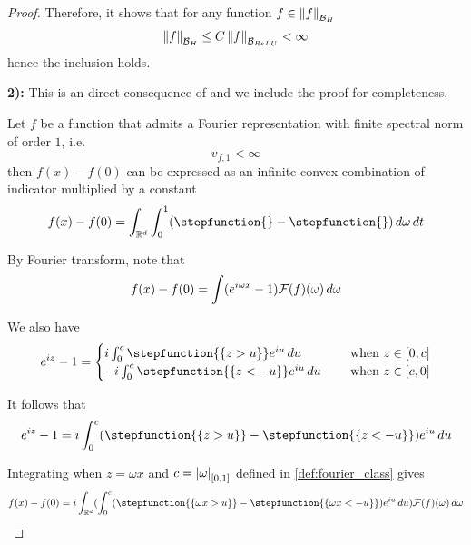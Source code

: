 \begin{proof}
Therefore, it shows that for any function $f \in \left\| f \right\|_{\mathcal{B}_H}$
\begin{equation}
    \left\| f \right\|_{\mathcal{B}_H} \leq C \left\| f \right\|_{\mathcal{B}_{ReLU}} < \infty
\end{equation}
hence the inclusion holds.

\textbf{2):} This is an direct consequence of \cite[Theorem
2]{barronNeuralNetApproximation1992} and we include the proof for completeness.

\begin{theorem}
    Let $f$ be a function that admits a Fourier representation with finite
    spectral norm of order $1$, i.e.
    \begin{equation}
        v_{f,1} < \infty
    \end{equation}
    then $f(x) - f(0)$ can be expressed as an infinite convex combination of
    indicator multiplied by a constant
    \begin{equation}
        f(x) - f(0) = \int_{\R^d}\int_0^1 (
            \stepfunction{} - \stepfunction{}
        ) \,d\omega\,dt
    \end{equation}
\end{theorem}

By Fourier transform, note that
\begin{equation}
    f(x) - f(0) = \int (e^{i\omega x} - 1) \mathcal{F}(f)(\omega)\,d\omega
\end{equation}

We also have
\begin{equation}
    e^{iz} - 1 =
    \begin{cases}
        i \int_0^c \stepfunction{\{z>u\}} e^{iu} \,du \quad
            &\text{ when } z \in [0,c] \\
        -i \int_0^c \stepfunction{\{z<-u\}} e^{iu} \,du \quad
            &\text{ when } z \in [c,0] 
    \end{cases}
\end{equation}

It follows that
\begin{equation}
    e^{iz} - 1 = i \int_0^c (
        \stepfunction{\{z>u\}} - \stepfunction{\{z<-u\}}  
    )
    e^{iu} \,du 
\end{equation}

Integrating when $z = \omega x$ and $c=\left| \omega \right|_{[0,1]}$ defined in
\eqref{def:fourier_class} gives
\begin{equation}
    f(x) -f(0) = i\int_{\R^d} (\int_0^{c} (
        \stepfunction{\{\omega x>u\}} - \stepfunction{\{\omega x<-u\}}
    ) e^{iu}\,du)
    \fourier{f}(\omega)\,d\omega
\end{equation}


\end{proof}

